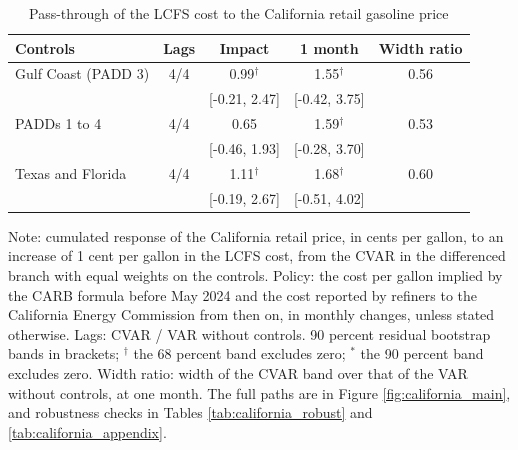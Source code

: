 \begin{table}[htbp]
\centering
\caption{Pass-through of the LCFS cost to the California retail gasoline price\label{tab:california_main}}
\small
\begin{tabular}{lcccc}
\toprule
Controls & Lags & Impact & 1 month & Width ratio \\
\midrule
Gulf Coast (PADD 3) & 4/4 & 0.99$^{\dagger}$ & 1.55$^{\dagger}$ & 0.56 \\
\footnotesize  &  & [-0.21, 2.47] & [-0.42, 3.75] &  \\[2pt]
PADDs 1 to 4 & 4/4 & 0.65 & 1.59$^{\dagger}$ & 0.53 \\
\footnotesize  &  & [-0.46, 1.93] & [-0.28, 3.70] &  \\[2pt]
Texas and Florida & 4/4 & 1.11$^{\dagger}$ & 1.68$^{\dagger}$ & 0.60 \\
\footnotesize  &  & [-0.19, 2.67] & [-0.51, 4.02] &  \\[2pt]
\bottomrule
\end{tabular}
\begin{minipage}{0.95\textwidth}\footnotesize
Note: cumulated response of the California retail price, in cents per gallon, to an increase of 1 cent per gallon in the LCFS cost, from the CVAR in the differenced branch with equal weights on the controls. Policy: the cost per gallon implied by the CARB formula before May 2024 and the cost reported by refiners to the California Energy Commission from then on, in monthly changes, unless stated otherwise. Lags: CVAR / VAR without controls. 90 percent residual bootstrap bands in brackets; $^{\dagger}$ the 68 percent band excludes zero; $^{*}$ the 90 percent band excludes zero. Width ratio: width of the CVAR band over that of the VAR without controls, at one month. The full paths are in Figure \ref{fig:california_main}, and robustness checks in Tables \ref{tab:california_robust} and \ref{tab:california_appendix}.
\end{minipage}
\end{table}

